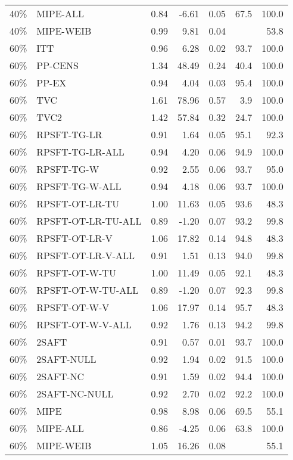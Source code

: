 \begin{table}[ht]
{\begin{tabular}{llrrrrr}
  40\% & MIPE-ALL & 0.84 & -6.61 & 0.05 & 67.5 & 100.0 \\ 
  40\% & MIPE-WEIB & 0.99 & 9.81 & 0.04 &  & 53.8 \\ 
   \hline
60\% & ITT & 0.96 & 6.28 & 0.02 & 93.7 & 100.0 \\ 
  60\% & PP-CENS & 1.34 & 48.49 & 0.24 & 40.4 & 100.0 \\ 
  60\% & PP-EX & 0.94 & 4.04 & 0.03 & 95.4 & 100.0 \\ 
  60\% & TVC & 1.61 & 78.96 & 0.57 & 3.9 & 100.0 \\ 
  60\% & TVC2 & 1.42 & 57.84 & 0.32 & 24.7 & 100.0 \\ 
   \hline
60\% & RPSFT-TG-LR & 0.91 & 1.64 & 0.05 & 95.1 & 92.3 \\ 
  60\% & RPSFT-TG-LR-ALL & 0.94 & 4.20 & 0.06 & 94.9 & 100.0 \\ 
  60\% & RPSFT-TG-W & 0.92 & 2.55 & 0.06 & 93.7 & 95.0 \\ 
  60\% & RPSFT-TG-W-ALL & 0.94 & 4.18 & 0.06 & 93.7 & 100.0 \\ 
  60\% & RPSFT-OT-LR-TU & 1.00 & 11.63 & 0.05 & 93.6 & 48.3 \\ 
  60\% & RPSFT-OT-LR-TU-ALL & 0.89 & -1.20 & 0.07 & 93.2 & 99.8 \\ 
  60\% & RPSFT-OT-LR-V & 1.06 & 17.82 & 0.14 & 94.8 & 48.3 \\ 
  60\% & RPSFT-OT-LR-V-ALL & 0.91 & 1.51 & 0.13 & 94.0 & 99.8 \\ 
   \hline
60\% & RPSFT-OT-W-TU & 1.00 & 11.49 & 0.05 & 92.1 & 48.3 \\ 
  60\% & RPSFT-OT-W-TU-ALL & 0.89 & -1.20 & 0.07 & 92.3 & 99.8 \\ 
  60\% & RPSFT-OT-W-V & 1.06 & 17.97 & 0.14 & 95.7 & 48.3 \\ 
  60\% & RPSFT-OT-W-V-ALL & 0.92 & 1.76 & 0.13 & 94.2 & 99.8 \\ 
   \hline
60\% & 2SAFT & 0.91 & 0.57 & 0.01 & 93.7 & 100.0 \\ 
  60\% & 2SAFT-NULL & 0.92 & 1.94 & 0.02 & 91.5 & 100.0 \\ 
  60\% & 2SAFT-NC & 0.91 & 1.59 & 0.02 & 94.4 & 100.0 \\ 
  60\% & 2SAFT-NC-NULL & 0.92 & 2.70 & 0.02 & 92.2 & 100.0 \\ 
  60\% & MIPE & 0.98 & 8.98 & 0.06 & 69.5 & 55.1 \\ 
  60\% & MIPE-ALL & 0.86 & -4.25 & 0.06 & 63.8 & 100.0 \\ 
  60\% & MIPE-WEIB & 1.05 & 16.26 & 0.08 &  & 55.1 \\ 
   \hline
\end{tabular}
}
\end{table}
